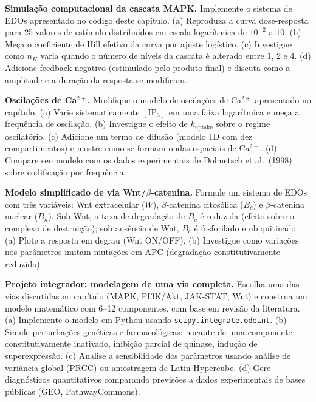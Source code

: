 \begin{exercicio}
\textbf{Simulação computacional da cascata MAPK.} Implemente o sistema de EDOs
apresentado no código deste capítulo. (a) Reproduza a curva dose-resposta
para 25 valores de estímulo distribuídos em escala logarítmica de
$10^{-2}$ a $10$. (b) Meça o coeficiente de Hill efetivo da curva por ajuste
logístico. (c) Investigue como $n_H$ varia quando o número de níveis da
cascata é alterado entre 1, 2 e 4. (d) Adicione feedback negativo
(estimulado pelo produto final) e discuta como a amplitude e a duração da
resposta se modificam.
\end{exercicio}

\begin{exercicio}
\textbf{Oscilações de Ca$^{2+}$.} Modifique o modelo de oscilações de
Ca$^{2+}$ apresentado no capítulo. (a) Varie sistematicamente $[\mathrm{IP}_3]$
em uma faixa logarítmica e meça a frequência de oscilação. (b) Investigue o
efeito de $k_{\mathrm{uptake}}$ sobre o regime oscilatório. (c) Adicione
um termo de difusão (modelo 1D com dez compartimentos) e mostre como se
formam ondas espaciais de Ca$^{2+}$. (d) Compare seu modelo com os dados
experimentais de Dolmetsch et al.\ (1998) sobre codificação por frequência.
\end{exercicio}

\begin{exercicio}
\textbf{Modelo simplificado de via Wnt/$\beta$-catenina.} Formule um sistema
de EDOs com três variáveis: Wnt extracelular ($W$), $\beta$-catenina
citosólica ($B_c$) e $\beta$-catenina nuclear ($B_n$). Sob Wnt, a taxa de
degradação de $B_c$ é reduzida (efeito sobre o complexo de destruição); sob
ausência de Wnt, $B_c$ é fosforilado e ubiquitinado. (a) Plote a resposta
em degrau (Wnt ON/OFF). (b) Investigue como variações nos parâmetros
imitam mutações em APC (degradação constitutivamente reduzida).
\end{exercicio}

\begin{exercicio}
\textbf{Projeto integrador: modelagem de uma via completa.} Escolha uma das
vias discutidas no capítulo (MAPK, PI3K/Akt, JAK-STAT, Wnt) e construa um
modelo matemático com 6--12 componentes, com base em revisão da literatura.
(a) Implemente o modelo em Python usando \texttt{scipy.integrate.odeint}.
(b) Simule perturbações genéticas e farmacológicas: nocaute de uma
componente constitutivamente inativado, inibição parcial de quinase,
indução de superexpressão. (c) Analise a sensibilidade dos parâmetros
usando análise de variância global (PRCC) ou amostragem de Latin Hypercube.
(d) Gere diagnósticos quantitativos comparando previsões a dados
experimentais de bases públicas (GEO, PathwayCommons).
\end{exercicio}

